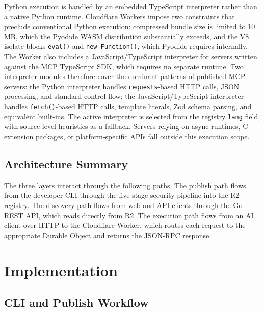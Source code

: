 \documentclass[conference]{IEEEtran}
\begin{document}
Python execution is handled by an embedded TypeScript interpreter rather
than a native Python runtime.
Cloudflare Workers impose two constraints that preclude conventional
Python execution: compressed bundle size is limited to 10\,MB, which
the Pyodide WASM distribution substantially exceeds, and the V8 isolate
blocks \texttt{eval()} and \texttt{new~Function()}, which Pyodide
requires internally.
The Worker also includes a JavaScript/TypeScript interpreter for servers
written against the MCP TypeScript SDK, which requires no separate
runtime.
Two interpreter modules therefore cover the dominant patterns of
published MCP servers: the Python interpreter handles
\texttt{requests}-based HTTP calls, JSON processing, and standard
control flow; the JavaScript/TypeScript interpreter handles
\texttt{fetch()}-based HTTP calls, template literals, Zod schema
parsing, and equivalent built-ins.
The active interpreter is selected from the registry \texttt{lang}
field, with source-level heuristics as a fallback.
Servers relying on async runtimes, C-extension packages, or
platform-specific APIs fall outside this execution scope.

\subsection{Architecture Summary}

The three layers interact through the following paths.
The publish path flows from the developer CLI through the five-stage
security pipeline into the R2 registry.
The discovery path flows from web and API clients through the Go REST
API, which reads directly from R2.
The execution path flows from an AI client over HTTP to the Cloudflare
Worker, which routes each request to the appropriate Durable Object
and returns the JSON-RPC response.

\section{Implementation}
\label{sec:impl}

\subsection{CLI and Publish Workflow}
\end{document}

